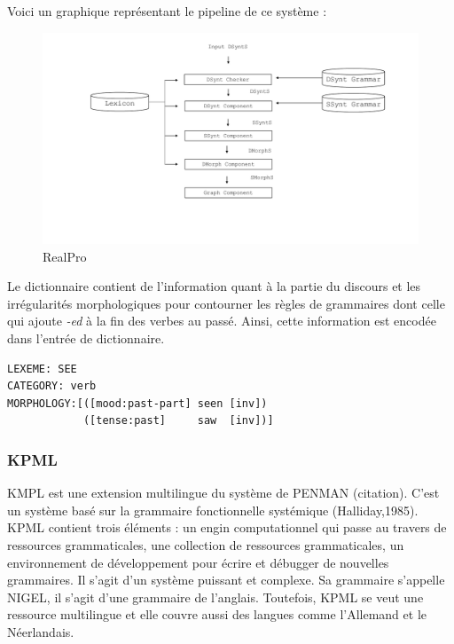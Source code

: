 Voici un graphique représentant le pipeline de ce système :
\begin{figure}[h]
	\centering
	\includegraphics[width=1\textwidth, trim = {0cm 0cm 0cm 0cm},clip]{ch2/figs/realpro.pdf}
	\caption{RealPro}
	\label{fig:RealPro}
\end{figure}

Le dictionnaire contient de l'information quant à la partie du discours et les irrégularités morphologiques pour contourner les règles de grammaires dont celle qui ajoute \emph{-ed} à la fin des verbes au passé. Ainsi, cette information est encodée dans l'entrée de dictionnaire.

\begin{lstlisting}[language=Xml, caption=Entrée de dictionnaire]
LEXEME: SEE
CATEGORY: verb
MORPHOLOGY:[([mood:past-part] seen [inv])
            ([tense:past]     saw  [inv])]
\end{lstlisting}


\subsubsection{KPML}
KMPL\citep{BatemanEnablingTechnologyMultilingual1997} est une extension multilingue du système de PENMAN (citation). C'est un système basé sur la grammaire fonctionnelle systémique (Halliday,1985). KPML contient trois éléments : un engin computationnel qui passe au travers de ressources grammaticales, une collection de ressources grammaticales, un environnement de développement pour écrire et débugger de nouvelles grammaires. Il s'agit d'un système puissant et complexe. Sa grammaire s'appelle NIGEL, il s'agit d'une grammaire de l'anglais. Toutefois, KPML se veut une ressource multilingue et elle couvre aussi des langues comme l'Allemand et le Néerlandais.

